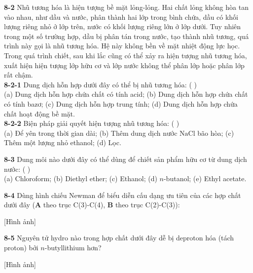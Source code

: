 \vspace{0.2cm}

\noindent
\textbf{8-2} Nhũ tương hóa là hiện tượng bề mặt lỏng-lỏng. Hai chất lỏng không hòa tan vào nhau, như dầu và nước, phân thành hai lớp trong bình chứa, dầu có khối lượng riêng nhỏ ở lớp trên, nước có khối lượng riêng lớn ở lớp dưới. Tuy nhiên trong một số trường hợp, dầu bị phân tán trong nước, tạo thành nhũ tương, quá trình này gọi là nhũ tương hóa. Hệ này không bền về mặt nhiệt động lực học. Trong quá trình chiết, sau khi lắc cũng có thể xảy ra hiện tượng nhũ tương hóa, xuất hiện hiện tượng lớp hữu cơ và lớp nước không thể phân lớp hoặc phân lớp rất chậm. \\
\textbf{8-2-1} Dung dịch hỗn hợp dưới đây có thể bị nhũ tương hóa: ( \hspace{1cm} ) \\
(a) Dung dịch hỗn hợp chứa chất có tính acid; (b) Dung dịch hỗn hợp chứa chất có tính bazơ; (c) Dung dịch hỗn hợp trung tính; (d) Dung dịch hỗn hợp chứa chất hoạt động bề mặt. \\
\textbf{8-2-2} Biện pháp giải quyết hiện tượng nhũ tương hóa: ( \hspace{1cm} ) \\
(a) Để yên trong thời gian dài; (b) Thêm dung dịch nước $\mathrm{NaCl}$ bão hòa; (c) Thêm một lượng nhỏ ethanol; (d) Lọc.

\vspace{0.2cm}

\noindent
\textbf{8-3} Dung môi nào dưới đây có thể dùng để chiết sản phẩm hữu cơ từ dung dịch nước: ( \hspace{1cm} ) \\
(a) Chloroform; (b) Diethyl ether; (c) Ethanol; (d) $n$-butanol; (e) Ethyl acetate.

\vspace{0.2cm}

\noindent
\textbf{8-4} Dùng hình chiếu Newman để biểu diễn cấu dạng ưu tiên của các hợp chất dưới đây (\textbf{A} theo trục C(3)-C(4), \textbf{B} theo trục C(2)-C(3)):
\begin{center}
    [Hình ảnh]
\end{center}

\vspace{0.2cm}

\noindent
\textbf{8-5} Nguyên tử hydro nào trong hợp chất dưới đây dễ bị deproton hóa (tách proton) bởi $n$-butyllithium hơn?
\begin{center}
    [Hình ảnh]
\end{center}

